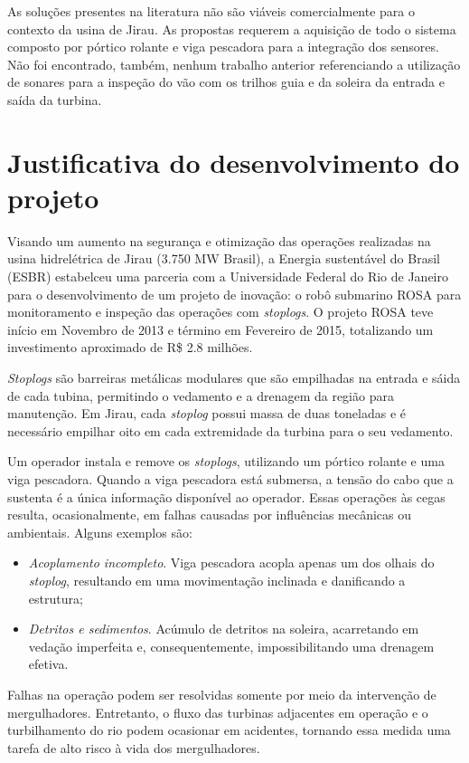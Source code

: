 As soluções presentes na literatura não são viáveis comercialmente
para o contexto da usina de Jirau. As propostas requerem a aquisição de todo o
sistema composto por pórtico rolante e viga pescadora para a integração dos
sensores. Não foi encontrado, também, nenhum trabalho anterior referenciando a
utilização de sonares para a inspeção do vão com os trilhos guia e da soleira da
entrada e saída da turbina.


\section{Justificativa do desenvolvimento do projeto}
Visando um aumento na segurança e otimização das operações realizadas na usina 
hidrelétrica de Jirau (3.750 MW Brasil), a Energia sustentável do Brasil (ESBR)
estabelceu uma parceria com a Universidade Federal do Rio de Janeiro para o desenvolvimento de um projeto de 
inovação: o robô submarino ROSA para monitoramento e inspeção das operações com
\textit{stoplogs}. O projeto ROSA teve início em Novembro de 2013 e término em
Fevereiro de 2015, totalizando um investimento aproximado de R\$ 2.8 milhões.

\textit{Stoplogs} são barreiras metálicas modulares que são empilhadas na
entrada e sáida de cada tubina, permitindo o vedamento e a drenagem da
região para manutenção. Em Jirau, cada \textit{stoplog} possui massa de duas
toneladas e é necessário empilhar oito em cada extremidade da turbina para o seu
vedamento.

Um operador instala e remove os \textit{stoplogs}, utilizando um pórtico
rolante e uma viga pescadora. Quando a viga pescadora está submersa, a tensão
do cabo que a sustenta é a única informação disponível ao operador. Essas
operações às cegas resulta, ocasionalmente, em falhas causadas por
influências mecânicas ou ambientais. Alguns exemplos são:

\begin{itemize}
\item \textit{Acoplamento incompleto}. Viga pescadora acopla apenas um dos
olhais do \textit{stoplog}, resultando em uma movimentação inclinada e danificando a estrutura;
\item \textit{Detritos e sedimentos}. Acúmulo de detritos na soleira,
acarretando em vedação imperfeita e, consequentemente, impossibilitando uma
drenagem efetiva.
\end{itemize}

Falhas na operação podem ser resolvidas somente por meio da intervenção de
mergulhadores. Entretanto, o fluxo das turbinas adjacentes em operação e o
turbilhamento do rio podem ocasionar em acidentes, tornando essa medida uma 
tarefa de alto risco à vida dos mergulhadores.


